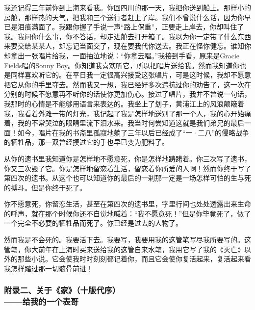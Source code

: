 \par 我还记得三年前你到上海来看我。你回四川的那一天，我把你送到船上。那样小的房舱，那样热的天气，把我和三个送行者赶上了岸。我们不曾说什么话，因为你早已是泪痕满面了。我跟你握了手说一声“路上保重”，正要走上岸去，你却叫住了我。我问你什么事，你不答话，却走进舱去打开箱子。我以为你一定带了什么东西来要交给某某人，却忘记当面交了，现在要我代你送去。我正在怪你健忘。谁知你却拿出一张唱片给我，一面抽泣地说：“你拿去唱。”我接到手看，原来是Gracie Fields唱的Sonny Boy。你知道我喜欢听它，所以把唱片送给我。然而我知道你也是同样喜欢听它的。在平日我一定很高兴接受这张唱片，可是这时候，我却不愿意把它从你的手里夺去。然而我又一想，我已经好多次违抗过你的劝告了，这一次在分别的时候不愿意再不听你的话使你更加伤心。接过了唱片，我并不曾说一句话，我那时的心情是不能够用语言来表达的。我坐上了划子，黄浦江上的风浪颠簸着我，我看着外滩一带的灯光，我记起了我是怎样地送别了那一个人，我的心开始痛着，我的不常哭泣的眼睛里流下泪水来。我当时何尝知道这就是我们弟兄的最后一面！如今，唱片在我的书斋里孤寂地躺了三年以后已经成了“一·二八”的侵略战争的牺牲品，那一双曾经摸过它的手也早已变为肥料了。
\par 从你的遗书里我知道你是怎样地不愿意死，你是怎样地踌躇着。你三次写了遗书，你又三次毁了它。你是怎样地留恋着生活，留恋着你所爱的人啊！然而你终于写了第四次的遗书。从这个也可以知道你的最后的一刹那一定是一场怎样可怕的生与死的搏斗。但是你终于死了。
\par 你不愿意死，你留恋生活，甚至在第四次的遗书里，字里行间也处处透露出来生命的呼声，就在那个时候你还不自觉地喊着：“我不愿意死！”但是你毕竟死了，做了一个完全不必要的牺牲品而死了。你已经是过去的人物了。
\par 然而我是不会死的。我要活下去。我要写，我要用我的这管笔写尽我所要写的。这管笔，你大前年在上海时买来送给我的这管自来水笔，我用它写了我的《灭亡》以外的那些小说。它会使我时时刻刻都记着你，而且它会使你复活起来，复活起来看我怎样踏过那一切骸骨前进！
\par {}
\par {}



\subsubsection*{附录二、关于《家》（十版代序）\\\small{——给我的一个表哥}}

